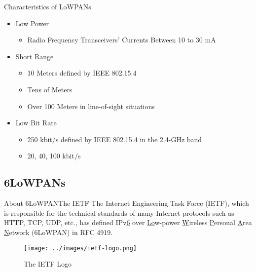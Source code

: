\documentclass[10pt]{beamer}
\begin{document}
\begin{frame}{Characteristics of LoWPANs\cite{rfc6568}}
    \begin{itemize}
        \item Low Power
            \begin{itemize}
                \item Radio Frequency Transceivers' Currents Between 10 to 30 mA
            \end{itemize}
        \item Short Range
            \begin{itemize}
                \item 10 Meters defined by IEEE 802.15.4
                \item Tens of Meters
                \item Over 100 Meters in line-of-sight situations
            \end{itemize}
        \item Low Bit Rate
            \begin{itemize}
                \item 250 kbit/s defined by IEEE 802.15.4 in the 2.4-GHz band
                \item 20, 40, 100 kbit/s
            \end{itemize}
    \end{itemize}
\end{frame}

\subsection{6LoWPANs}
\begin{frame}{About 6LoWPAN}{The IETF}
    The Internet Engineering Task Force (IETF), which is responsible for the technical standards of many Internet protocols such as HTTP, TCP, UDP, etc., has defined IPv\underline{6} over \underline{Lo}w-power \underline{W}ireless \underline{P}ersonal \underline{A}rea \underline{N}etwork (6LoWPAN) in RFC 4919\cite{rfc4919}.

    \begin{figure}[htpb]
        \centering
        \texttt{[image: ../images/ietf-logo.png]}
        \caption{The IETF Logo\cite{IETF}}
    \end{figure}

\end{frame}
\end{document}
